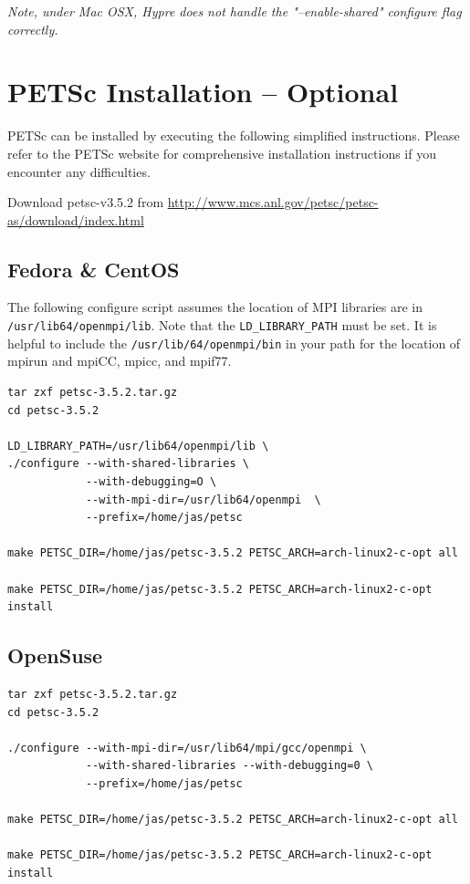 \documentclass[12pt]{article}
\begin{document}
\emph{Note, under Mac OSX, Hypre does not handle the "--enable-shared" configure
  flag correctly.}

\section{PETSc Installation -- Optional}

PETSc can be installed by executing the following simplified
instructions.  Please refer to the PETSc website for comprehensive
installation instructions if you encounter any difficulties.

Download petsc-v3.5.2 from
\url{http://www.mcs.anl.gov/petsc/petsc-as/download/index.html}

\subsection{Fedora \& CentOS}

The following configure script assumes the location of MPI libraries
are in \texttt{/usr/lib64/openmpi/lib}.  Note that the
\texttt{LD\_LIBRARY\_PATH} must be set.  It is helpful to include the
\texttt{/usr/lib/64/openmpi/bin} in your path for the location of
mpirun and mpiCC, mpicc, and mpif77.

\begin{verbatim}
tar zxf petsc-3.5.2.tar.gz
cd petsc-3.5.2

LD_LIBRARY_PATH=/usr/lib64/openmpi/lib \
./configure --with-shared-libraries \
            --with-debugging=O \
            --with-mpi-dir=/usr/lib64/openmpi  \
            --prefix=/home/jas/petsc

make PETSC_DIR=/home/jas/petsc-3.5.2 PETSC_ARCH=arch-linux2-c-opt all

make PETSC_DIR=/home/jas/petsc-3.5.2 PETSC_ARCH=arch-linux2-c-opt install

\end{verbatim}

\subsection{OpenSuse}

\begin{verbatim}
tar zxf petsc-3.5.2.tar.gz
cd petsc-3.5.2

./configure --with-mpi-dir=/usr/lib64/mpi/gcc/openmpi \
            --with-shared-libraries --with-debugging=0 \
            --prefix=/home/jas/petsc

make PETSC_DIR=/home/jas/petsc-3.5.2 PETSC_ARCH=arch-linux2-c-opt all

make PETSC_DIR=/home/jas/petsc-3.5.2 PETSC_ARCH=arch-linux2-c-opt install

\end{verbatim}
\end{document}
